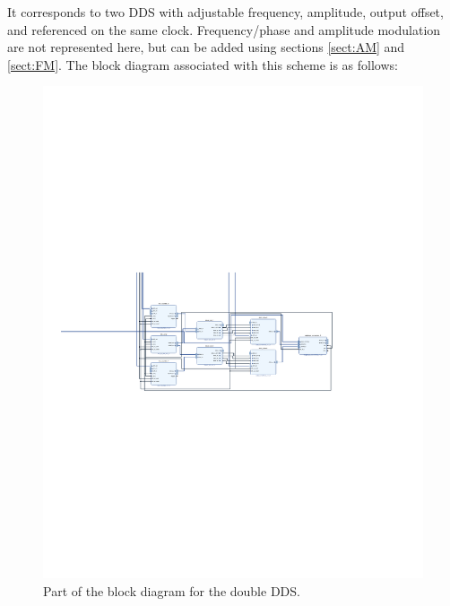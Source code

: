 \documentclass[12pt,oneside]{article}
\begin{document}
It corresponds to two DDS with adjustable frequency, amplitude, output offset, and referenced on the same clock. Frequency/phase and amplitude modulation are not represented here, but can be added using sections \ref{sect:AM} and \ref{sect:FM}. The block diagram associated with this scheme is as follows:

\begin{figure}[h!tb]
	\begin{center}
		\includegraphics[width=16cm,trim={5cm 10.5cm 5cm 12cm}, clip]{figures/doubleDDS.pdf}
		\caption{Part of the block diagram for the double DDS.}
		\label{fig:doubleDDS}
	\end{center}
\end{figure}
\end{document}
